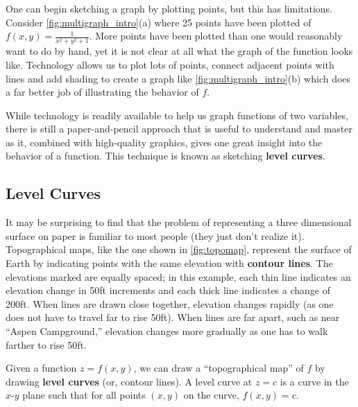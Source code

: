 One can begin sketching a graph by plotting points, but this has limitations. Consider \autoref{fig:multigraph_intro}(a) where 25 points have been plotted of $f(x,y) = \frac1{x^2+y^2+1}$. More points have been plotted than one would reasonably want to do by hand, yet it is not clear at all what the graph of the function looks like. Technology allows us to plot lots of points, connect adjacent points with lines and add shading to create a graph like \autoref{fig:multigraph_intro}(b) which does a far better job of illustrating the behavior of $f$.

While technology is readily available to help us graph functions of two variables, there is still a paper-and-pencil approach that is useful to understand and master as it, combined with high-quality graphics, gives one great insight into the behavior of a function. This technique is known as sketching \textbf{level curves}.

\subsection{Level Curves}

It may be surprising to find that the problem of representing a three dimensional surface on paper is familiar to most people (they just don't realize it). Topographical maps, like the one shown in \autoref{fig:topomap}, represent the surface of Earth by indicating points with the same elevation with \textbf{contour lines}. The elevations marked are equally spaced; in this example, each thin line indicates an elevation change in 50ft increments and each thick line indicates a change of 200ft. When lines are drawn close together, elevation changes rapidly (as one does not have to travel far to rise 50ft). When lines are far apart, such as near ``Aspen Campground,'' elevation changes more gradually as one has to walk farther to rise 50ft.


Given a function $z=f(x,y)$, we can draw a ``topographical map'' of $f$ by drawing \textbf{level curves} (or, contour lines). A level curve at $z=c$ is a curve in the $x$-$y$ plane such that for all points $(x,y)$ on the curve, $f(x,y) = c$. 

